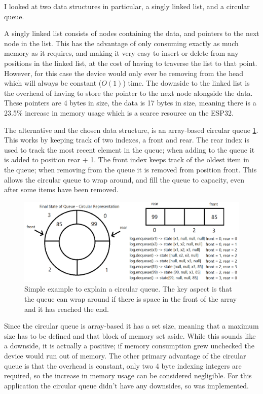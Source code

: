 \documentclass{l4proj}
\begin{document}
I looked at two data structures in particular, a singly linked list, and a circular queue.

A singly linked list consists of nodes containing the data, and pointers to the next node in the list. This has the advantage of only consuming exactly as much memory as it requires, and making it very easy to insert or delete from any positions in the linked list, at the cost of having to traverse the list to that point. However, for this case the device would only ever be removing from the head which will always be constant ($O(1)$) time. The downside to the linked list is the overhead of having to store the pointer to the next node alongside the data. These pointers are 4 bytes in size, the data is 17 bytes in size, meaning there is a 23.5\% increase in memory usage which is a scarce resource on the ESP32.

The alternative and the chosen data structure, is an array-based circular queue \ref{fig:circular_queue}. This works by keeping track of two indexes, a front and rear. The rear index is used to track the most recent element in the queue; when adding to the queue it is added to position rear + 1. The front index keeps track of the oldest item in the queue; when removing from the queue it is removed from position front. This allows the circular queue to wrap around, and fill the queue to capacity, even after some items have been removed.

\begin{figure}[!htb]
    \centering
    \includegraphics[width=1.0\linewidth]{images/circular_queue.png}

    \caption{ Simple example to explain a circular queue. The key aspect is that the queue can wrap around if there is space in the front of the array and it has reached the end. }

    \label{fig:circular_queue}
\end{figure}

Since the circular queue is array-based it has a set size, meaning that a maximum size has to be defined and that block of memory set aside. While this sounds like a downside, it is actually a positive; if memory consumption grew unchecked the device would run out of memory. The other primary advantage of the circular queue is that the overhead is constant, only two 4 byte indexing integers are required, so the increase in memory usage can be considered negligible. For this application the circular queue didn't have any downsides, so was implemented.
\end{document}
